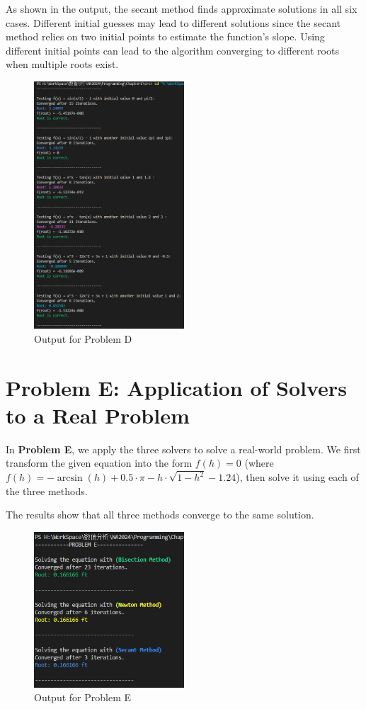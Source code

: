 \documentclass[a4paper]{article}
\begin{document}
As shown in the output, the secant method finds approximate solutions in all six cases. Different initial guesses may lead to different solutions since the secant method relies on two initial points to estimate the function's slope. Using different initial points can lead to the algorithm converging to different roots when multiple roots exist.

\begin{figure}[H]  
  \centering
  \includegraphics[width=0.5\textwidth]{./picture/ProblemD.png}
  \caption{Output for Problem D}
\end{figure}

\section{Problem E: Application of Solvers to a Real Problem}

In \textbf{Problem E}, we apply the three solvers to solve a real-world problem. We first transform the given equation into the form $f(h) = 0$ (where $f(h) = -\arcsin(h) + 0.5 \cdot \pi - h \cdot \sqrt{1 - h^2} - 1.24$), then solve it using each of the three methods.

The results show that all three methods converge to the same solution.

\begin{figure}[H]  
  \centering
  \includegraphics[width=0.5\textwidth]{./picture/ProblemE.png}
  \caption{Output for Problem E}
\end{figure}
\end{document}
